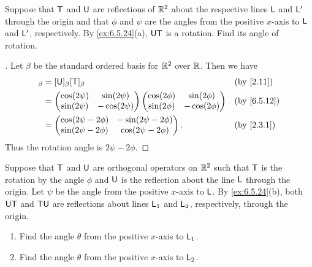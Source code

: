 \begin{ex}\label{ex:6.5.25}
  Suppose that \(\mathsf{T}\) and \(\mathsf{U}\) are reflections of \(\mathbb{R}^2\) about the respective lines \(\mathsf{L}\) and \(\mathsf{L}'\) through the origin and that \(\phi\) and \(\psi\) are the angles from the positive \(x\)-axis to \(\mathsf{L}\) and \(\mathsf{L}'\), respectively.
  By \cref{ex:6.5.24}(a), \(\mathsf{U} \mathsf{T}\) is a rotation.
  Find its angle of rotation.
\end{ex}

\begin{proof}[]
  Let \(\beta\) be the standard ordered basis for \(\mathbb{R}^2\) over \(\mathbb{R}\).
  Then we have
  \begin{align*}
    [\U \T]_{\beta} & = [\U]_{\beta} [\T]_{\beta}                       &  & \by{2.11} \\
                    & = \begin{pmatrix}
                          \cos(2 \psi) & \sin(2 \psi)  \\
                          \sin(2 \psi) & -\cos(2 \psi)
                        \end{pmatrix} \begin{pmatrix}
                                        \cos(2 \phi) & \sin(2 \phi)  \\
                                        \sin(2 \phi) & -\cos(2 \phi)
                                      \end{pmatrix}                   &  & \by{6.5.12} \\
                    & = \begin{pmatrix}
                          \cos(2 \psi - 2 \phi) & -\sin(2 \psi - 2 \phi) \\
                          \sin(2 \psi - 2 \phi) & \cos(2 \psi - 2 \phi)
                        \end{pmatrix}. &  & \by{2.3.1}
  \end{align*}
  Thus the rotation angle is \(2 \psi - 2 \phi\).
\end{proof}

\begin{ex}\label{ex:6.5.26}
  Suppose that \(\mathsf{T}\) and \(\mathsf{U}\) are orthogonal operators on \(\mathbb{R}^2\) such that \(\mathsf{T}\) is the rotation by the angle \(\phi\) and \(\mathsf{U}\) is the reflection about the line \(\mathsf{L}\) through the origin.
  Let \(\psi\) be the angle from the positive \(x\)-axis to \(\mathsf{L}\).
  By \cref{ex:6.5.24}(b), both \(\mathsf{U} \mathsf{T}\) and \(\mathsf{T} \mathsf{U}\) are reflections about lines \(\mathsf{L}_1\) and \(\mathsf{L}_2\), respectively, through the origin.
  \begin{enumerate}
    \item Find the angle \(\theta\) from the positive \(x\)-axis to \(\mathsf{L}_1\).
    \item Find the angle \(\theta\) from the positive \(x\)-axis to \(\mathsf{L}_2\).
  \end{enumerate}
\end{ex}

